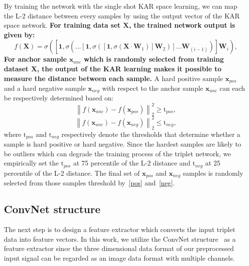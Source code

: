 \documentclass[sigconf]{acmart}
\begin{document}
By training the network with the single shot KAR space learning, we can map the L-2 distance between every samples by using the output vector of the KAR space network. \textbf{For training data set $\mathbf{X}$, the trained network output is given by:}
\begin{equation}
    f\left(\mathbf{X}\right) = \sigma\left(\left[\mathbf{1},\sigma\left(\dots\left[\mathbf{1},\sigma\left(\left[\mathbf{1},\sigma\left(\mathbf{X}\cdot\mathbf{W}_{1}\right)\right]\mathbf{W}_{2}\right)\right]\dots\mathbf{W}_{(i-1)}\right)\right]\mathbf{W}_{i}\right),
\end{equation}
\textbf{For anchor sample $\mathbf{x}_{anc}$ which is randomly selected from training dataset X, the output of the KAR learning makes it possible to measure the distance between each sample.}
A hard positive sample $\mathbf{x}_{pos}$ and a hard negative sample $\mathbf{x}_{neg}$ with respect to the anchor sample $\mathbf{x}_{anc}$ can each be respectively determined based on:
\begin{equation}
    {\left\| {{f\left(\mathbf{x}_{anc}\right)} - {f\left(\mathbf{x}_{pos}\right)}} \right\|_2^2} \geq \mathrm{t}_{pos}, \label{pos}
\end{equation}
\begin{equation}
    {\left\| {{f\left(\mathbf{x}_{anc}\right)} - {f\left(\mathbf{x}_{neg}\right)}} \right\|_2^2} \leq \mathrm{t}_{neg},\label{neg}
\end{equation}
where $\mathrm{t}_{pos}$ and $\mathrm{t}_{neg}$ respectively denote the thresholds that determine whether a sample is hard positive or hard negative. Since the hardest samples are likely to be outliers which can degrade the training process of the triplet network, we empirically set the $\mathrm{t}_{pos}$ at 75 percentile of the L-2 distance and $\mathrm{t}_{neg}$ at 25 percentile of the L-2 distance. The final set of $\mathbf{x}_{pos}$ and $\mathbf{x}_{neg}$ samples is randomly selected from those samples threshold by~\eqref{pos} and~\eqref{neg}.

\subsection{ConvNet structure}

The next step is to design a feature extractor which converts the input triplet data into feature vectors. In this work, we utilize the ConvNet structure~\cite{lecun1998gradient} as a feature extractor since the three dimensional data format of our preprocessed input signal can be regarded as an image data format with multiple channels. 
\end{document}
